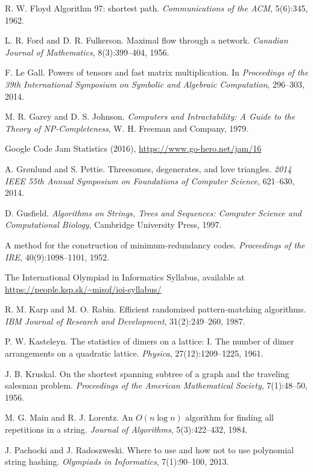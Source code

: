 \begin{thebibliography}{9}
  R. W. Floyd
  Algorithm 97: shortest path.
  \emph{Communications of the ACM}, 5(6):345, 1962.

  L. R. Ford and D. R. Fulkerson.
  Maximal flow through a network.
  \emph{Canadian Journal of Mathematics}, 8(3):399--404, 1956.

  F. Le Gall.
  Powers of tensors and fast matrix multiplication.
  In \emph{Proceedings of the 39th International Symposium on Symbolic and Algebraic Computation},
  296--303, 2014.

  M. R. Garey and D. S. Johnson.
  \emph{Computers and Intractability:
  A Guide to the Theory of NP-Completeness},
  W. H. Freeman and Company, 1979.

  Google Code Jam Statistics (2016),
  \url{https://www.go-hero.net/jam/16}

  A. Grønlund and S. Pettie.
  Threesomes, degenerates, and love triangles.
  \emph{2014 IEEE 55th Annual Symposium on Foundations of Computer Science},
  621--630, 2014.

  D. Gusfield.
  \emph{Algorithms on Strings, Trees and Sequences:
  Computer Science and Computational Biology},
  Cambridge University Press, 1997.

  A method for the construction of minimum-redundancy codes.
  \emph{Proceedings of the IRE}, 40(9):1098--1101, 1952.

  The International Olympiad in Informatics Syllabus, available at
  \url{https://people.ksp.sk/~misof/ioi-syllabus/}

  R. M. Karp and M. O. Rabin.
  Efficient randomized pattern-matching algorithms.
  \emph{IBM Journal of Research and Development}, 31(2):249--260, 1987.

  P. W. Kasteleyn.  
  The statistics of dimers on a lattice: I. The number of dimer arrangements on a quadratic lattice.
  \emph{Physica}, 27(12):1209--1225, 1961.

  J. B. Kruskal.
  On the shortest spanning subtree of a graph and the traveling salesman problem.
  \emph{Proceedings of the American Mathematical Society}, 7(1):48--50, 1956.

  M. G. Main and R. J. Lorentz.
  An $O(n \log n)$ algorithm for finding all repetitions in a string.
  \emph{Journal of Algorithms}, 5(3):422--432, 1984.

  J. Pachocki and J. Radoszweski.
  Where to use and how not to use polynomial string hashing.
  \emph{Olympiads in Informatics}, 7(1):90--100, 2013.


\end{thebibliography}
